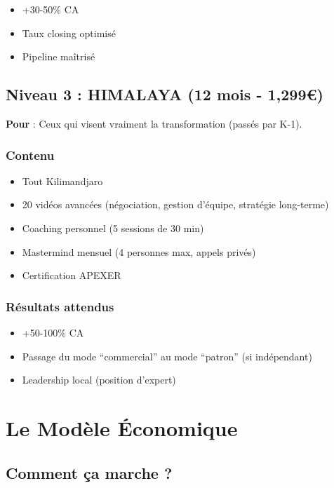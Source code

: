 \documentclass[12pt,a4paper,openany]{book}
\begin{document}
\begin{itemize}
\item +30-50\% CA
\item Taux closing optimisé
\item Pipeline maîtrisé
\end{itemize}

\section{Niveau 3 : HIMALAYA (12 mois - 1,299\euro{})}

\textbf{Pour} : Ceux qui visent vraiment la transformation (passés par K-1).

\subsection{Contenu}

\begin{itemize}
\item Tout Kilimandjaro
\item 20 vidéos avancées (négociation, gestion d'équipe, stratégie long-terme)
\item Coaching personnel (5 sessions de 30 min)
\item Mastermind mensuel (4 personnes max, appels privés)
\item Certification APEXER
\end{itemize}

\subsection{Résultats attendus}

\begin{itemize}
\item +50-100\% CA
\item Passage du mode ``commercial'' au mode ``patron'' (si indépendant)
\item Leadership local (position d'expert)
\end{itemize}

\clearpage

\chapter{Le Modèle Économique}

\section{Comment ça marche ?}
\end{document}
